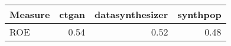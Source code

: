 \begin{tabular}{lrrr}
  \toprule
Measure & ctgan & datasynthesizer & synthpop \\ 
  \midrule
ROE & 0.54 & 0.52 & 0.48 \\ 
   \bottomrule
\end{tabular}
